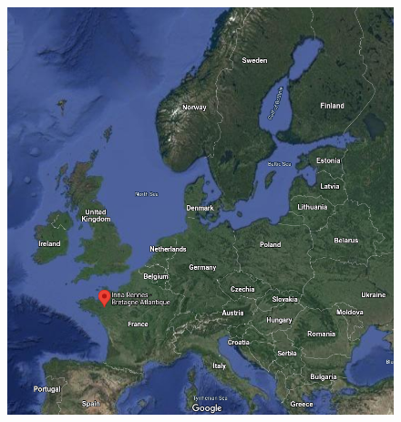 \begin{frame}
\begin{figure}
{    \includegraphics[height=0.4\textheight]{fig/inria-map.png}}
  \end{figure}
\end{frame}

